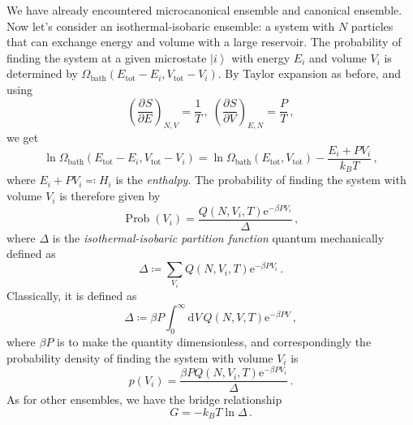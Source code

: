\documentclass{article}
\theoremstyle{plain}\theoremheaderfont{\normalfont\bfseries}\theorembodyfont{\rmfamily}\theoremseparator{.}\newtheorem*{thm}{Theorem}\newtheorem*{law}{Law}\newtheorem*{pos}{Postulate}
\numberwithin{equation}{section}
\newcommand{\ee}{\mathrm{e}}
\newcommand{\dd}[2][]{\mathrm{d}^{#1} #2\,}
\newcommand{\pdv}[3][]{\frac{\partial^{#1} #2}{{\partial #3}^{#1}}}
\newcommand{\ket}[1]{\left| #1 \right\rangle}
\newcommand{\bath}{\text{bath}}
\newcommand{\tot}{\text{tot}}
\DeclareMathOperator{\Prob}{Prob}
\begin{document}
    We have already encountered microcanonical ensemble and canonical ensemble. Now let's consider an isothermal-isobaric ensemble: a system with \(N\) particles that can exchange energy and volume with a large reservoir. The probability of finding the system at a given microstate \(\ket{i}\) with energy \(E_i\) and volume \(V_i\) is determined by \(\Omega_{\bath}(E_{\tot}-E_i,V_{\tot}-V_i)\). By Taylor expansion as before, and using
    \begin{equation}
        \left(\pdv{S}{E}\right)_{N,V}=\frac{1}{T}\,,\;\left(\pdv{S}{V}\right)_{E,N}=\frac{P}{T}\,,
    \end{equation}
    we get
    \begin{equation}
        \ln{\Omega_{\bath}(E_{\tot}-E_i,V_{\tot}-V_i)}=\ln{\Omega_{\bath}(E_{\tot},V_{\tot})}-\frac{E_i+PV_i}{k_BT}\,,
    \end{equation}
    where \(E_i+PV_i\eqqcolon H_i\) is the \textit{enthalpy}. The probability of finding the system with volume \(V_i\) is therefore given by
    \begin{equation}
        \Prob(V_i)=\frac{Q(N,V_i,T)\ee^{-\beta PV_i}}{\Delta}\,,
    \end{equation}
    where \(\Delta\) is the \textit{isothermal-isobaric partition function} quantum mechanically defined as
    \begin{equation}
        \Delta\coloneqq\sum_{V_i}Q(N,V_i,T)\ee^{-\beta PV_i}\,.
    \end{equation}
    Classically, it is defined as
    \begin{equation}
        \Delta\coloneqq\beta P\int_{0}^{\infty}\dd{V}Q(N,V,T)\ee^{-\beta PV}\,,
    \end{equation}
    where \(\beta P\) is to make the quantity dimensionless, and correspondingly the probability density of finding the system with volume \(V_i\) is
    \begin{equation}
        p(V_i)=\frac{\beta P Q(N,V_i,T)\ee^{-\beta PV_i}}{\Delta}\,.
    \end{equation}
    As for other ensembles, we have the bridge relationship
    \begin{equation}
        G=-k_BT\ln\Delta\,.
    \end{equation}
\end{document}
